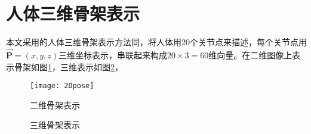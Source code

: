 \section{人体三维骨架表示}
\label{sec:skeleton}

本文采用的人体三维骨架表示方法同\cite{bo2010twin}，将人体用20个关节点来描述，每个关节点用$\overrightarrow{\mathbf{P}}=(x,y,z)$三维坐标表示，串联起来构成$20\times3=60$维向量。在二维图像上表示骨架如图\ref{fig:2Ddemo}，三维表示如图\ref{fig:3Ddemo}，

\begin{figure}[htbp]
  \centering
  \texttt{[image: 2Dpose]}\\
  \caption{二维骨架表示}\label{fig:2Ddemo}
\end{figure}

\begin{figure}[htbp]
  \centering
  \subcaptionbox{}{\texttt{[image: 3D\_1]}\hspace{1cm}}
  \subcaptionbox{}{\texttt{[image: 3D\_2]}\hspace{1cm}}
  \subcaptionbox{}{\texttt{[image: 3D\_3]}}
  \caption{三维骨架表示}\label{fig:3Ddemo}
\end{figure}

